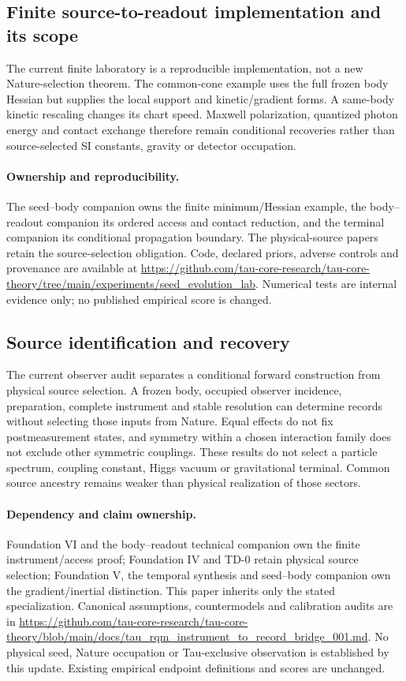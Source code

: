 \documentclass[11pt]{article}
\begin{document}
\subsection{Finite source-to-readout implementation and its scope}
The current finite laboratory is a reproducible implementation, not a new Nature-selection theorem. The common-cone example uses the full frozen body Hessian but supplies the local support and kinetic/gradient forms. A same-body kinetic rescaling changes its chart speed. Maxwell polarization, quantized photon energy and contact exchange therefore remain conditional recoveries rather than source-selected SI constants, gravity or detector occupation.
\paragraph{Ownership and reproducibility.}
The seed--body companion owns the finite minimum/Hessian example, the body--readout companion its ordered access and contact reduction, and the terminal companion its conditional propagation boundary. The physical-source papers retain the source-selection obligation. Code, declared priors, adverse controls and provenance are available at \url{https://github.com/tau-core-research/tau-core-theory/tree/main/experiments/seed_evolution_lab}. Numerical tests are internal evidence only; no published empirical score is changed.

\subsection{Source identification and recovery}
The current observer audit separates a conditional forward construction from physical source selection. A frozen body, occupied observer incidence, preparation, complete instrument and stable resolution can determine records without selecting those inputs from Nature. Equal effects do not fix postmeasurement states, and symmetry within a chosen interaction family does not exclude other symmetric couplings. These results do not select a particle spectrum, coupling constant, Higgs vacuum or gravitational terminal. Common source ancestry remains weaker than physical realization of those sectors.

\paragraph{Dependency and claim ownership.}
Foundation VI and the body--readout technical companion own the finite instrument/access proof; Foundation IV and TD-0 retain physical source selection; Foundation V, the temporal synthesis and seed--body companion own the gradient/inertial distinction. This paper inherits only the stated specialization. Canonical assumptions, countermodels and calibration audits are in \url{https://github.com/tau-core-research/tau-core-theory/blob/main/docs/tau_rqm_instrument_to_record_bridge_001.md}. No physical seed, Nature occupation or Tau-exclusive observation is established by this update. Existing empirical endpoint definitions and scores are unchanged.
\end{document}
